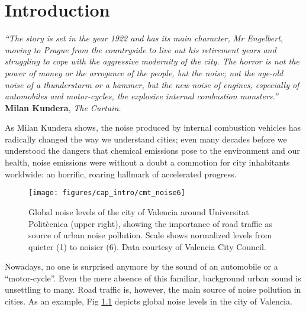 \chapter{Introduction} \label{cap:intro}

\null\vspace{-10mm}
\begin{flushright}
\begin{minipage}[t]{0.66\textwidth}
{\itshape\small``The story is set in the year 1922 and has its main character, Mr Engelbert, moving to Prague from the countryside to live out his retirement years and struggling to cope with the aggressive modernity of the city. The horror is not the power of money or the arrogance of the people, but the noise; not the age-old noise of a thunderstorm or a hammer, but the new noise of engines, especially of automobiles and motor-cycles, the explosive internal combustion monsters.''}\\[-3mm]

{\cabincondensed\small\hfill \textbf{Milan Kundera}, \emph{The Curtain.}}\\[5mm]
\end{minipage}
\end{flushright}

\noindent As Milan Kundera shows, the noise produced by internal combustion vehicles has radically changed the way we understand cities; even many decades before we understood the dangers that chemical emissions pose to the environment and our health, noise emissions were without a doubt a commotion for city inhabitants worldwide: an horrific, roaring hallmark of accelerated progress.

\begin{figure}[t!]
\centering
\texttt{[image: figures/cap\_intro/cmt\_noise6]}
\caption{Global noise levels of the city of Valencia around Universitat Politècnica (upper right), showing the importance of road traffic as source of urban noise pollution. Scale shows normalized levels from quieter (1) to noisier (6). Data courtesy of Valencia City Council.}
\label{fig:noise_valencia}
\end{figure}

Nowadays, no one is surprised anymore by the sound of an automobile or a ``motor-cycle''. Even the mere absence of this familiar, background urban sound is unsettling to many. Road traffic is, however, the main source of noise pollution in cities. As an example, Fig \ref{fig:noise_valencia} depicts global noise levels in the city of Valencia.

